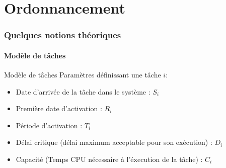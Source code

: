 %                                                    
%
%


\part{Ordonnancement}

\section{Quelques notions théoriques}

\subsection{Modèle de tâches}

\begin{frame}{Modèle de tâches}
  Paramètres définissant une tâche $i$:
  \begin{itemize}
    \item Date d'arrivée de la tâche dans le système : $S_i$
    \item Première date d'activation : $R_i$
    \item Période d'activation : $T_i$
    \item Délai critique (délai maximum acceptable pour son exécution)
      : $D_i$
    \item Capacité (Temps CPU nécessaire à l'éxecution de la tâche) :
      $C_i$
  \end{itemize}
\end{frame}

